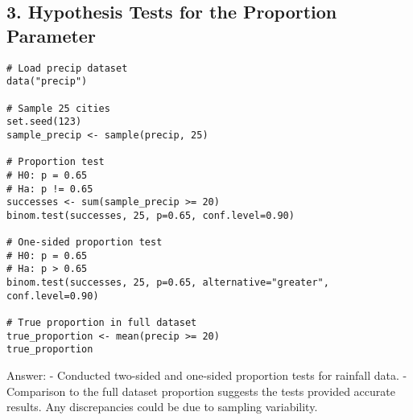 \documentclass{article}
\begin{document}
\subsection*{3. Hypothesis Tests for the Proportion Parameter}
\begin{lstlisting}
# Load precip dataset
data("precip")

# Sample 25 cities
set.seed(123)
sample_precip <- sample(precip, 25)

# Proportion test
# H0: p = 0.65
# Ha: p != 0.65
successes <- sum(sample_precip >= 20)
binom.test(successes, 25, p=0.65, conf.level=0.90)

# One-sided proportion test
# H0: p = 0.65
# Ha: p > 0.65
binom.test(successes, 25, p=0.65, alternative="greater", conf.level=0.90)

# True proportion in full dataset
true_proportion <- mean(precip >= 20)
true_proportion
\end{lstlisting}
Answer:
- Conducted two-sided and one-sided proportion tests for rainfall data.
- Comparison to the full dataset proportion suggests the tests provided accurate results. Any discrepancies could be due to sampling variability.
\end{document}
